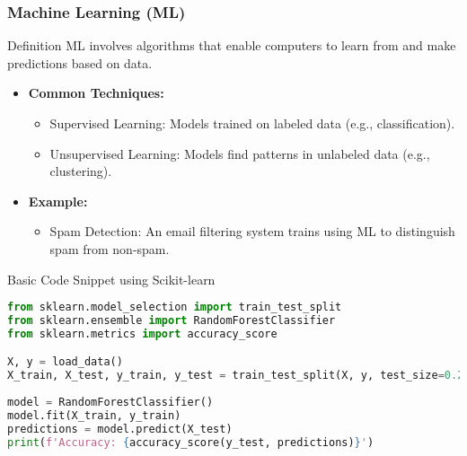 \documentclass[aspectratio=169]{beamer}
\begin{document}
\begin{frame}[fragile]
    \frametitle{Machine Learning (ML)}
    \begin{block}{Definition}
        ML involves algorithms that enable computers to learn from and make predictions based on data.
    \end{block}
    
    \begin{itemize}
        \item \textbf{Common Techniques:}
        \begin{itemize}
            \item Supervised Learning: Models trained on labeled data (e.g., classification).
            \item Unsupervised Learning: Models find patterns in unlabeled data (e.g., clustering).
        \end{itemize}
        \item \textbf{Example:} 
            \begin{itemize}
                \item Spam Detection: An email filtering system trains using ML to distinguish spam from non-spam.
            \end{itemize}
    \end{itemize}
    
    \begin{block}{Basic Code Snippet using Scikit-learn}
        \begin{lstlisting}[language=Python]
from sklearn.model_selection import train_test_split
from sklearn.ensemble import RandomForestClassifier
from sklearn.metrics import accuracy_score

X, y = load_data()  
X_train, X_test, y_train, y_test = train_test_split(X, y, test_size=0.2)
   
model = RandomForestClassifier()
model.fit(X_train, y_train)
predictions = model.predict(X_test)
print(f'Accuracy: {accuracy_score(y_test, predictions)}')
        \end{lstlisting}
    \end{block}
\end{frame}
\end{document}
